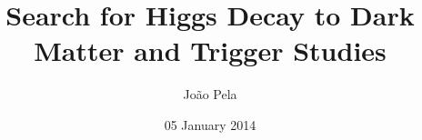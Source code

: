 \documentclass[a4paper,10pt]{book}
\title{Search for Higgs Decay to Dark Matter and Trigger Studies}
\author{João Pela}
\date{05 January 2014}
\begin{document}
 
\maketitle
\tableofcontents








\glsaddall
\printglossaries
\end{document}
